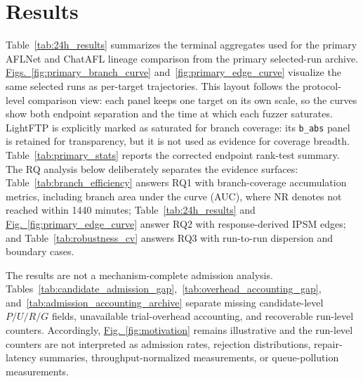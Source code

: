\documentclass[final,5p,times,number]{elsarticle}
\newcommand{\figref}[1]{\hyperref[#1]{Fig.~\ref*{#1}}}
\newcommand{\figsref}[2]{\hyperref[#1]{Figs.~\ref*{#1}} and~\hyperref[#2]{\ref*{#2}}}
\begin{document}
\section{Results}

Table~\ref{tab:24h_results} summarizes the terminal aggregates used for the primary AFLNet and ChatAFL lineage comparison from the primary selected-run archive. \figsref{fig:primary_branch_curve}{fig:primary_edge_curve} visualize the same selected runs as per-target trajectories. This layout follows the protocol-level comparison view: each panel keeps one target on its own scale, so the curves show both endpoint separation and the time at which each fuzzer saturates. LightFTP is explicitly marked as saturated for branch coverage: its \texttt{b\_abs} panel is retained for transparency, but it is not used as evidence for coverage breadth. Table~\ref{tab:primary_stats} reports the corrected endpoint rank-test summary. The RQ analysis below deliberately separates the evidence surfaces: Table~\ref{tab:branch_efficiency} answers RQ1 with branch-coverage accumulation metrics, including branch area under the curve (AUC), where NR denotes not reached within 1440 minutes; Table~\ref{tab:24h_results} and \figref{fig:primary_edge_curve} answer RQ2 with response-derived IPSM edges; and Table~\ref{tab:robustness_cv} answers RQ3 with run-to-run dispersion and boundary cases.

The results are not a mechanism-complete admission analysis. Tables~\ref{tab:candidate_admission_gap},~\ref{tab:overhead_accounting_gap}, and~\ref{tab:admission_accounting_archive} separate missing candidate-level $P/U/R/G$ fields, unavailable trial-overhead accounting, and recoverable run-level counters. Accordingly, \figref{fig:motivation} remains illustrative and the run-level counters are not interpreted as admission rates, rejection distributions, repair-latency summaries, throughput-normalized measurements, or queue-pollution measurements.
\end{document}
